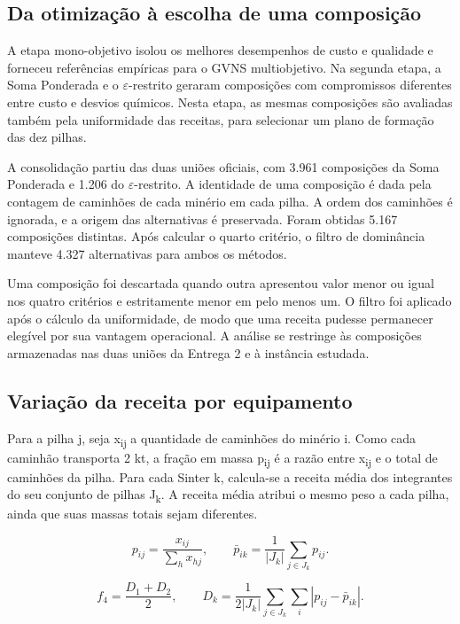 \documentclass[12pt,a4paper]{article}
\begin{document}
\subsection{Da otimização à escolha de uma composição}

A etapa mono-objetivo isolou os melhores desempenhos de custo e qualidade e forneceu referências empíricas para o GVNS multiobjetivo. Na segunda etapa, a Soma Ponderada e o \(\varepsilon\)-restrito geraram composições com compromissos diferentes entre custo e desvios químicos. Nesta etapa, as mesmas composições são avaliadas também pela uniformidade das receitas, para selecionar um plano de formação das dez pilhas.

A consolidação partiu das duas uniões oficiais, com 3.961 composições da Soma Ponderada e 1.206 do \(\varepsilon\)-restrito. A identidade de uma composição é dada pela contagem de caminhões de cada minério em cada pilha. A ordem dos caminhões é ignorada, e a origem das alternativas é preservada. Foram obtidas 5.167 composições distintas. Após calcular o quarto critério, o filtro de dominância manteve 4.327 alternativas para ambos os métodos.

Uma composição foi descartada quando outra apresentou valor menor ou igual nos quatro critérios e estritamente menor em pelo menos um. O filtro foi aplicado após o cálculo da uniformidade, de modo que uma receita pudesse permanecer elegível por sua vantagem operacional. A análise se restringe às composições armazenadas nas duas uniões da Entrega 2 e à instância estudada.

\subsection{Variação da receita por equipamento}

Para a pilha j, seja x\textsubscript{i}\textsubscript{j} a quantidade de caminhões do minério i. Como cada caminhão transporta 2 kt, a fração em massa p\textsubscript{i}\textsubscript{j} é a razão entre x\textsubscript{i}\textsubscript{j} e o total de caminhões da pilha. Para cada Sinter k, calcula-se a receita média dos integrantes do seu conjunto de pilhas J\textsubscript{k}. A receita média atribui o mesmo peso a cada pilha, ainda que suas massas totais sejam diferentes.

\[p_{ij}=\frac{x_{ij}}{\sum_h x_{hj}},\qquad \bar p_{ik}=\frac{1}{|J_k|}\sum_{j\in J_k}p_{ij}.\]

\[f_4=\frac{D_1+D_2}{2},\qquad D_k=\frac{1}{2|J_k|}\sum_{j\in J_k}\sum_i|p_{ij}-\bar p_{ik}|.\]
\end{document}

